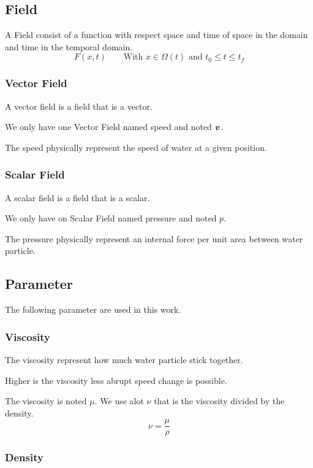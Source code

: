 \subsection{Field}

A Field consist of a function with respect space and time of space in the domain and time in the temporal domain.
\begin{equation}
 F(x,t)\qquad \text{With $x\in\Omega(t)$ and $t_0\leq t \leq t_f$}
\end{equation}

\subsubsection{Vector Field}
A vector field is a field that is a vector.

We only have one Vector Field named speed and noted ${\boldsymbol v}$.

The speed physically represent the speed of water at a given position.
\subsubsection{Scalar Field}
A scalar field is a field that is a scalar.

We only have on Scalar Field named pressure and noted $p$.

The pressure physically represent an internal force per unit area between water particle.

\subsection{Parameter}

The following parameter are used in this work.

\subsubsection{Viscosity}
The viscosity represent how much water particle stick together.

Higher is the viscosity less abrupt speed change is possible.

The viscosity is noted $\mu$. We use alot $\nu$ that is the viscosity divided by the density.
\begin{equation}
 \nu=\frac{\mu}{\rho}
\end{equation}

\subsubsection{Density}

